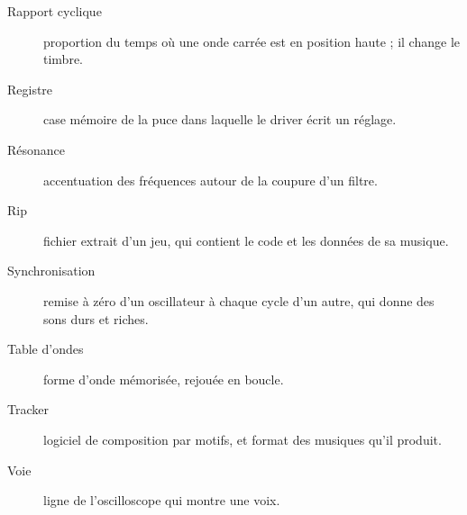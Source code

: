\begin{description}
  \item[Rapport cyclique] proportion du temps où une onde carrée est en position haute ; il change le timbre.
  \item[Registre] case mémoire de la puce dans laquelle le driver écrit un réglage.
  \item[Résonance] accentuation des fréquences autour de la coupure d'un filtre.
  \item[Rip] fichier extrait d'un jeu, qui contient le code et les données de sa musique.
  \item[Synchronisation] remise à zéro d'un oscillateur à chaque cycle d'un autre, qui donne des sons durs et
        riches.
  \item[Table d'ondes] forme d'onde mémorisée, rejouée en boucle.
  \item[Tracker] logiciel de composition par motifs, et format des musiques qu'il produit.
  \item[Voie] ligne de l'oscilloscope qui montre une voix.
\end{description}
